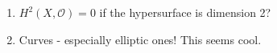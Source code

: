 \documentclass[10pt,letter]{article}
\begin{document}
\begin{enumerate}
\item $H^2(X,\mathcal{O}) = 0$ if the hypersurface is dimension 2? 
\item Curves - especially elliptic ones! This seems cool.

\end{enumerate} 
\end{document}
